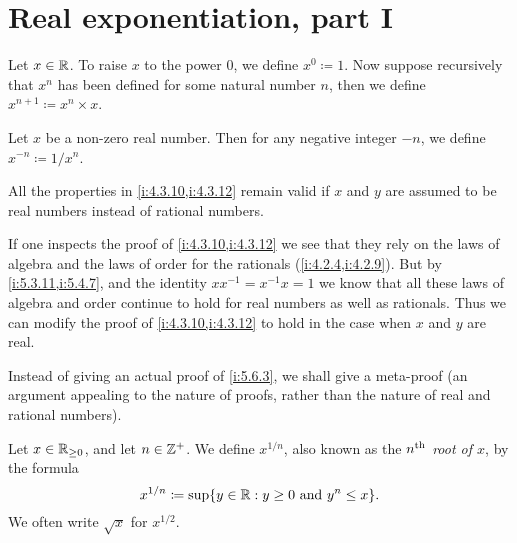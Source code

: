 \section{Real exponentiation, part I}\label{i:sec:5.6}

\begin{defn}\label{i:5.6.1}
  Let \(x \in \mathbb{R}\).
  To raise \(x\) to the power \(0\), we define \(x^0 \coloneqq 1\).
  Now suppose recursively that \(x^n\) has been defined for some natural number \(n\), then we define \(x^{n + 1} \coloneqq x^n \times x\).
\end{defn}

\begin{defn}\label{i:5.6.2}
  Let \(x\) be a non-zero real number.
  Then for any negative integer \(-n\), we define \(x^{-n} \coloneqq 1 / x^n\).
\end{defn}

\begin{prop}\label{i:5.6.3}
  All the properties in \cref{i:4.3.10,i:4.3.12} remain valid if \(x\) and \(y\) are assumed to be real numbers instead of rational numbers.
\end{prop}

\begin{meta-proof}[\pf{i:5.6.3}]
If one inspects the proof of \cref{i:4.3.10,i:4.3.12} we see that they rely on the laws of algebra and the laws of order for the rationals (\cref{i:4.2.4,i:4.2.9}).
But by \cref{i:5.3.11,i:5.4.7}, and the identity \(xx^{-1} = x^{-1} x = 1\) we know that all these laws of algebra and order continue to hold for real numbers as well as rationals.
Thus we can modify the proof of \cref{i:4.3.10,i:4.3.12} to hold in the case when \(x\) and \(y\) are real.
\end{meta-proof}

\begin{note}
  Instead of giving an actual proof of \cref{i:5.6.3}, we shall give a meta-proof
  (an argument appealing to the nature of proofs, rather than the nature of real and rational numbers).
\end{note}

\begin{defn}\label{i:5.6.4}
  Let \(x \in \mathbb{R}_{\geq 0}\), and let \(n \in \mathbb{Z}^+\).
  We define \(x^{1 / n}\), also known as the \emph{\(n^{\operatorname{th}}\) root of \(x\)}, by the formula
  \[
    x^{1 / n} \coloneqq \sup\set{y \in \R : y \geq 0 \text{ and } y^n \leq x}.
  \]
  We often write \(\sqrt{x}\) for \(x^{1 / 2}\).
\end{defn}

